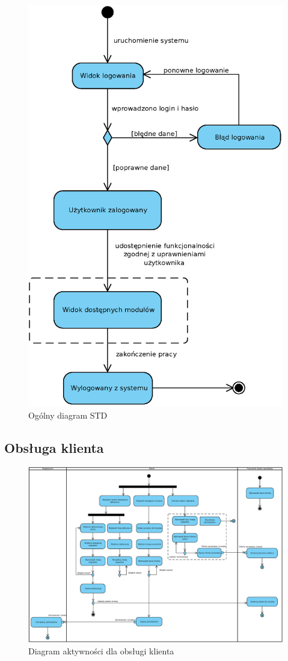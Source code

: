
\begin{figure}[H]
		\centering
		\includegraphics[width=.8\textwidth]{img/AD/STDmain.eps}
		\caption{Ogólny diagram STD}
\end{figure}


\subsection{Obsługa klienta}
\begin{landscape}
		\begin{figure}[H]
			\centering
			\centerline{\includegraphics[width=24cm]{img/AD/klient.eps}}
		\caption{Diagram aktywności dla obsługi klienta}
		\end{figure}
\end{landscape}

